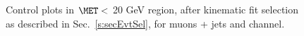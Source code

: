 \begin{figure}
    \vfil
    \caption{Control plots in $\MET <$ 20 GeV region, after kinematic fit selection as described in Sec.~\ref{s:secEvtSel}, 
for muons + jets and \ejets channel.}
    \label{fig:LowMET_kfitPlot1}
\end{figure}

